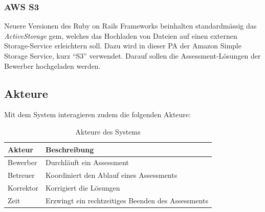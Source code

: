 \subsubsection{AWS S3}
Neuere Versionen des Ruby on Rails Frameworks beinhalten standardmässig das \emph{ActiveStorage} gem, welches das Hochladen von Dateien auf einen
externen Storage-Service erleichtern soll. Dazu wird in dieser PA der Amazon Simple Storage Service, kurz \enquote{S3} verwendet.
Darauf sollen die Assessment-Lösungen der Bewerber hochgeladen werden.

\subsection{Akteure}

Mit dem System interagieren zudem die folgenden Akteure:

\begin{table}[H]
    \renewcommand{\arraystretch}{}
    \begin{tabular}{|l|l|}
        \hline
        \rowcolor{PrimaryColor!30} Akteur & Beschreibung                                       \\
        \hline
        Bewerber                          & Durchläuft ein Assessment                          \\
        \hline
        Betreuer                          & Koordiniert den Ablauf eines Assessments           \\
        \hline
        Korrektor                         & Korrigiert die Lösungen                            \\
        \hline
        Zeit                              & Erzwingt ein rechtzeitiges Beenden des Assessments \\
        \hline
    \end{tabular}
    \caption{\label{tab:participants} Akteure des Systems}
\end{table}
